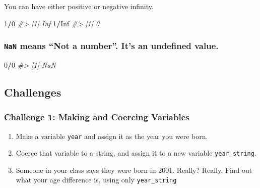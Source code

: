 \documentclass[]{book}
\newenvironment{Shaded}{\begin{snugshade}}{\end{snugshade}}
\newcommand{\DecValTok}[1]{\textcolor[rgb]{0.00,0.00,0.81}{#1}}
\newcommand{\CommentTok}[1]{\textcolor[rgb]{0.56,0.35,0.01}{\textit{#1}}}
\newcommand{\OtherTok}[1]{\textcolor[rgb]{0.56,0.35,0.01}{#1}}
\newcommand{\OperatorTok}[1]{\textcolor[rgb]{0.81,0.36,0.00}{\textbf{#1}}}
\providecommand{\tightlist}{%
  \setlength{\itemsep}{0pt}\setlength{\parskip}{0pt}}
\begin{document}
You can have either positive or negative infinity.

\begin{Shaded}
\begin{Highlighting}[]
\DecValTok{1}\OperatorTok{/}\DecValTok{0}
\CommentTok{#> [1] Inf}
\DecValTok{1}\OperatorTok{/}\OtherTok{Inf}
\CommentTok{#> [1] 0}
\end{Highlighting}
\end{Shaded}

\subsubsection*{\texorpdfstring{\texttt{NaN} means ``Not a number''.
It's an undefined
value.}{NaN means Not a number. It's an undefined value.}}\label{nan-means-not-a-number.-its-an-undefined-value.}

\begin{Shaded}
\begin{Highlighting}[]
\DecValTok{0}\OperatorTok{/}\DecValTok{0}
\CommentTok{#> [1] NaN}
\end{Highlighting}
\end{Shaded}

\subsection{Challenges}\label{challenges-4}

\subsubsection*{Challenge 1: Making and Coercing
Variables}\label{challenge-1-making-and-coercing-variables}

\begin{enumerate}
\def\labelenumi{\arabic{enumi}.}
\tightlist
\item
  Make a variable \texttt{year} and assign it as the year you were born.
\item
  Coerce that variable to a string, and assign it to a new variable
  \texttt{year\_string}.
\item
  Someone in your class says they were born in 2001. Really? Really.
  Find out what your age difference is, using only \texttt{year\_string}
\end{enumerate}
\end{document}
